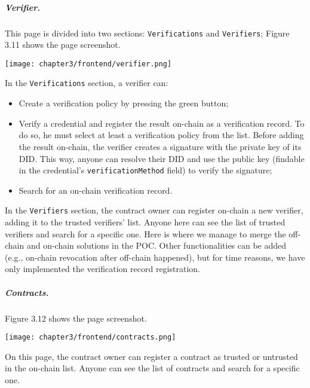 \clearpage
\subparagraph{Verifier.} This page is divided into two sections: \texttt{Verifications}
and \texttt{Verifiers}; Figure 3.11 shows the page screenshot.
\begin{center}
    \begin{tcolorbox}[
        beamer,
        width=0.6\textheight,
        arc=0pt,
        boxsep=0pt,
        left=0pt,right=0pt,top=0pt,bottom=0pt,
        ]
    \texttt{[image: chapter3/frontend/verifier.png]}
    \end{tcolorbox}
\end{center}
\vspace{0.3cm}
In the \texttt{Verifications} section, a verifier can:
\begin{itemize}
    \item Create a verification policy by pressing the green button;
    \item Verify a credential and register the result on-chain as a verification record. 
    To do so, he must select at least a verification policy from the list.
    Before adding the result on-chain, the verifier creates a signature with the 
    private key of its DID. This way, anyone can resolve their DID and use the public 
    key (findable in the credential's \texttt{verificationMethod} field) to verify the 
    signature;
    \item Search for an on-chain verification record.
\end{itemize}
\vspace*{0.3cm}
In the \texttt{Verifiers} section, the contract owner can register on-chain a new 
verifier, adding it to the trusted verifiers' list. Anyone here can see the list of
trusted verifiers and search for a specific one.
Here is where we manage to merge the off-chain and on-chain solutions in
the POC. Other functionalities can be added (e.g., on-chain revocation after off-chain
happened), but for time reasons, we have only implemented the verification record 
registration.

\clearpage
\subparagraph{Contracts.} Figure 3.12 shows the page screenshot.
\begin{center}
    \begin{tcolorbox}[
        beamer,
        width=0.6\textheight,
        arc=0pt,
        boxsep=0pt,
        left=0pt,right=0pt,top=0pt,bottom=0pt,
        ]
    \texttt{[image: chapter3/frontend/contracts.png]}
    \end{tcolorbox}
\end{center}
On this page, the contract owner can register a contract as trusted or untrusted
in the on-chain list. Anyone can see the list of contracts and search for
a specific one.

